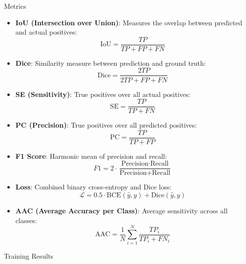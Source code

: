 \documentclass[aspectratio=169,xcolor=dvipsnames]{beamer}
\newcommand{\vtab}{\vspace{0.3cm}}
\begin{document}
\begin{frame}[allowframebreaks]{Metrics}
    \begin{multicols}{2}
        \begin{itemize}
            \item \textbf{IoU (Intersection over Union)}: Measures the overlap between predicted and actual positives:
            \[
            \text{IoU} = \frac{TP}{TP + FP + FN}
            \]
            
            \item \textbf{Dice}: Similarity measure between prediction and ground truth:
            \[
            \text{Dice} = \frac{2TP}{2TP + FP + FN}
            \]

            \item \textbf{SE (Sensitivity)}: True positives over all actual positives:
            \[
            \text{SE} = \frac{TP}{TP + FN}
            \]

            \item \textbf{PC (Precision)}: True positives over all predicted positives:
            \[
            \text{PC} = \frac{TP}{TP + FP}
            \]
        \end{itemize}
    \end{multicols}
    \begin{multicols}{2}
        \begin{itemize}
            \item \textbf{F1 Score}: Harmonic mean of precision and recall:
            \[
            F1 = 2 \cdot \frac{\text{Precision} \cdot \text{Recall}}{\text{Precision} + \text{Recall}}
            \]
            \vtab
            \item \textbf{Loss}: Combined binary cross-entropy and Dice loss:
            \[
            \mathcal{L} = 0.5 \cdot \text{BCE}(\hat{y}, y) + \text{Dice}(\hat{y}, y)
            \]
            \item \textbf{AAC (Average Accuracy per Class)}: Average sensitivity across all classes:
            \[
            \text{AAC} = \frac{1}{N} \sum_{i=1}^{N} \frac{TP_i}{TP_i + FN_i}
            \]
        \end{itemize}
    \end{multicols}
\end{frame}


\begin{frame}{Training Results}
    \begin{table}
        \footnotesize
        \fittowidth[.83\textwidth]{}
    \end{table}
\end{frame}
\end{document}
